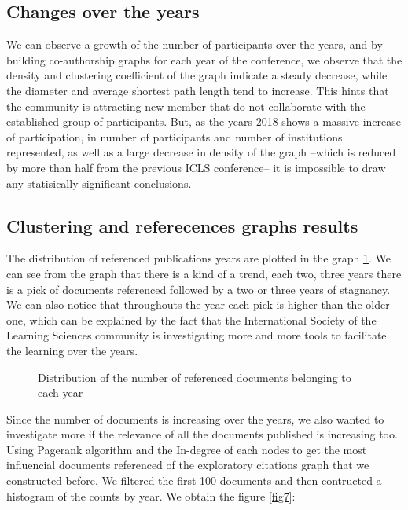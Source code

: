 \documentclass[article,twocolumn]{IEEEtran}
\begin{document}
    \hypertarget{changes-over-the-years}{%
\subsection{Changes over the years}\label{changes-over-the-years}}

We can observe a growth of the number of participants over the years,
and by building co-authorship graphs for each year of the conference, we
observe that the density and clustering coefficient of the graph
indicate a steady decrease, while the diameter and average shortest path
length tend to increase. This hints that the community is attracting new
member that do not collaborate with the established group of
participants. But, as the years 2018 shows a massive increase of
participation, in number of participants and number of institutions
represented, as well as a large decrease in density of the graph --which
is reduced by more than half from the previous ICLS conference-- it is
impossible to draw any statisically significant conclusions.

    \hypertarget{clustering-and-referecences-graphs-results}{%
\subsection{Clustering and referecences graphs
results}\label{clustering-and-referecences-graphs-results}}

The distribution of referenced publications years are plotted in the
graph \ref{count_ref_docs}. We can see from the graph that there is a
kind of a trend, each two, three years there is a pick of documents
referenced followed by a two or three years of stagnancy. We can also
notice that throughouts the year each pick is higher than the older one,
which can be explained by the fact that the International Society of the
Learning Sciences community is investigating more and more tools to
facilitate the learning over the years.


    \begin{figure}
        \begin{center}\end{center}
        \caption{Distribution of the number of referenced documents belonging to each year}
        \label{count_ref_docs}
    \end{figure}
    
    Since the number of documents is increasing over the years, we also
wanted to investigate more if the relevance of all the documents
published is increasing too. Using Pagerank algorithm and the In-degree
of each nodes to get the most influencial documents referenced of the
exploratory citations graph that we constructed before. We filtered the
first 100 documents and then contructed a histogram of the counts by
year. We obtain the figure \ref{fig7}:
\end{document}
